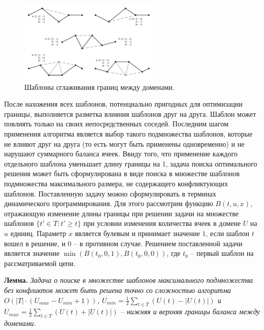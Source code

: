 \documentclass[a4paper,14pt]{extarticle}                     %
\theoremstyle{plain}                                         %
\begin{document}
\begin{figure}[ht]
\centering
\includegraphics[width=0.6\textwidth]{./pics/text_2_smooth/smooth-border.pdf}
\singlespacing
\caption{Шаблоны сглаживания границ между доменами.}
\label{fig:text_2_smooth_smooth_border}
\end{figure}

После нахожения всех шаблонов, потенциально пригодных для оптимизации границы, выполняется разметка влияния шаблонов друг на друга.
Шаблон может повлиять только на своих непосредственных соседей.
Последним шагом применения алгоритма является выбор такого подмножества шаблонов, которые не влияют друг на друга (то есть могут быть применены одновременно) и не нарушают суммарного баланса ячеек.
Ввиду того, что применение каждого отдельного шаблона уменьшает длину границы на 1, задача поиска оптимального решения может быть сформулирована в виде поиска в множестве шаблонов подмножества максимального размера, не содержащего конфликтующих шаблонов.
Поставленную задачу можно сформулировать в терминах динамического программирования.
Для этого рассмотрим функцию $B(t, u, x)$, отражающую изменение длины границы при решении задачи на множестве шаблонов $\{ t' \in T : t' \ge t \}$ при условии изменения количества ячеек в домене $U$ на $u$ единиц.
Параметр $x$ является булевым и принимает значение $1$, если шаблон $t$ вошел в решение, и $0$ -- в противном случае.
Решением поставленной задачи является значение $\min(B(t_0, 0, 1), B(t_0, 0, 0))$, где $t_0$ -- первый шаблон на рассматриваемой цепи.

\textbf{Лемма.} \textit{Задача о поиске в множестве шаблонов максимального подмножества без конфликтов может быть решена точно со сложностью алгоритма $O \left( |T| \cdot (U_{max} - U_{min} + 1) \right)$, $U_{min} = \frac{1}{2} \sum_{t \in T}{(U(t) - |U(t)|)}$ и $U_{max} = \frac{1}{2} \sum_{t \in T}{(U(t) + |U(t)|)}$ -- нижняя и верхняя границы баланса между доменами.}
\end{document}
